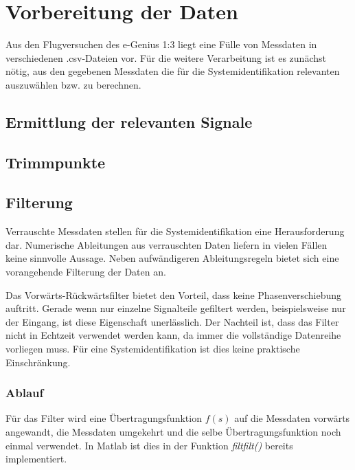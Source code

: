 \chapter{Vorbereitung der Daten}

Aus den Flugversuchen des e-Genius 1:3 liegt eine Fülle von Messdaten in verschiedenen .csv-Dateien vor. Für die weitere 
Verarbeitung ist es zunächst nötig, aus den gegebenen Messdaten die für die 
Systemidentifikation relevanten auszuwählen bzw. zu berechnen.

\section{Ermittlung der relevanten Signale} %

\section{Trimmpunkte} %

\section{Filterung} %

Verrauschte Messdaten stellen für die Systemidentifikation eine Herausforderung dar. Numerische Ableitungen aus verrauschten Daten liefern in vielen Fällen keine sinnvolle Aussage. Neben aufwändigeren Ableitungsregeln bietet sich eine vorangehende Filterung der Daten an.

Das Vorwärts-Rückwärtsfilter bietet den Vorteil, dass keine Phasenverschiebung 
auftritt. Gerade wenn nur einzelne Signalteile gefiltert werden, beispielsweise 
nur der Eingang, ist diese Eigenschaft unerlässlich. Der Nachteil ist, dass das 
Filter nicht in Echtzeit verwendet werden kann, da immer die vollständige 
Datenreihe vorliegen muss. Für eine Systemidentifikation ist dies keine 
praktische Einschränkung.

\subsection{Ablauf}

Für das Filter wird eine Übertragungsfunktion $f(s)$ auf die Messdaten vorwärts 
angewandt, die Messdaten umgekehrt und die selbe Übertragungsfunktion noch 
einmal verwendet. In Matlab ist dies in der Funktion \textit{filtfilt()} 
bereits implementiert. 

